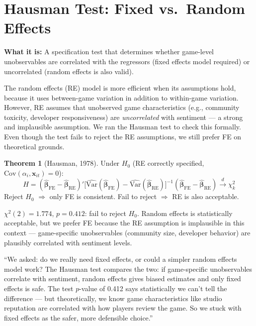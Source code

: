 \documentclass[11pt, letterpaper]{article}
\theoremstyle{definition}
\newtheorem{theorem}{Theorem}[section]
\begin{document}
\section{Hausman Test: Fixed vs.\ Random Effects}

\textbf{What it is:} A specification test that determines whether game-level unobservables are correlated with the regressors (fixed effects model required) or uncorrelated (random effects is also valid).

\begin{whybox}
The random effects (RE) model is more efficient when its assumptions hold, because it uses between-game variation in addition to within-game variation.
However, RE assumes that unobserved game characteristics (e.g., community toxicity, developer responsiveness) are \emph{uncorrelated} with sentiment --- a strong and implausible assumption.
We ran the Hausman test to check this formally.
Even though the test fails to reject the RE assumptions, we still prefer FE on theoretical grounds.
\end{whybox}

\begin{mathbox}
\begin{theorem}[Hausman, 1978]
Under $H_0$ (RE correctly specified, $\text{Cov}(\alpha_i, \mathbf{x}_{it}) = 0$):
\[
    H = (\hat{\boldsymbol{\beta}}_{\text{FE}} - \hat{\boldsymbol{\beta}}_{\text{RE}})'\!
    \Big[\widehat{\text{Var}}(\hat{\boldsymbol{\beta}}_{\text{FE}}) - \widehat{\text{Var}}(\hat{\boldsymbol{\beta}}_{\text{RE}})\Big]^{-1}\!
    (\hat{\boldsymbol{\beta}}_{\text{FE}} - \hat{\boldsymbol{\beta}}_{\text{RE}}) \xrightarrow{d} \chi^2_k
\]
Reject $H_0$ $\Rightarrow$ only FE is consistent. Fail to reject $\Rightarrow$ RE is also acceptable.
\end{theorem}
\end{mathbox}

\begin{resultbox}
$\chi^2(2) = 1.774$, $p = 0.412$: fail to reject $H_0$.
Random effects is statistically acceptable, but we prefer FE because the RE assumption is implausible in this context --- game-specific unobservables (community size, developer behavior) are plausibly correlated with sentiment levels.
\end{resultbox}

\begin{speakerbox}
``We asked: do we really need fixed effects, or could a simpler random effects model work?
The Hausman test compares the two: if game-specific unobservables correlate with sentiment, random effects gives biased estimates and only fixed effects is safe.
The test $p$-value of 0.412 says statistically we can't tell the difference --- but theoretically, we know game characteristics like studio reputation are correlated with how players review the game.
So we stuck with fixed effects as the safer, more defensible choice.''
\end{speakerbox}
\end{document}
